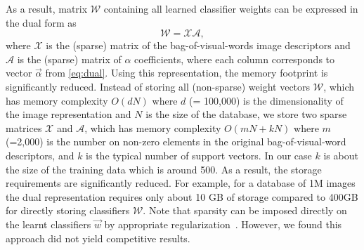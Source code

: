 %   
As a result, matrix $\mathcal{W}$ containing all learned classifier weights can be expressed in the dual form as
      \begin{equation}
      \label{eq:dual}
        \mathcal{W} = \mathcal{X} \mathcal{A},  
      \end{equation}
      \noindent
      where $\mathcal{X}$ is the (sparse) matrix of the bag-of-visual-words image descriptors and $\mathcal{A}$ is the (sparse) matrix of $\alpha$ coefficients, 
   where each column corresponds to vector $\vec{\alpha}$ from \eqref{eq:dual}. 
Using this representation, the memory footprint is significantly reduced. Instead of storing all (non-sparse) weight vectors $\mathcal{W}$, which has memory complexity $O(dN)$ where $d$ (= 100,000) is the dimensionality of the image representation and $N$ is the size of the database, we store two sparse matrices $\mathcal{X}$ and $\mathcal{A}$, which has memory complexity $O(mN+kN)$ where $m$(=2,000) is the number on non-zero elements in the original bag-of-visual-word descriptors, and $k$ is the typical number of support vectors. In our case $k$ is about the size of the training data which is around 500. As a result, the storage requirements are significantly reduced. For example, for a database of 1M images the dual representation requires only about 10 GB of storage compared to 400GB for directly storing classifiers $\mathcal{W}$.  
Note that sparsity can be imposed directly on the learnt classifiers $\vec{w}$ by appropriate regularization~\cite{scholkopf2002learning}. However, we found this approach did not yield competitive results.
